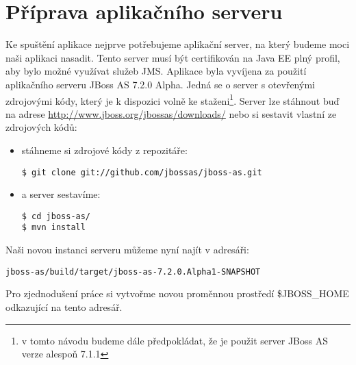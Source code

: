 \documentclass[122pt,oneside]{fithesis}
\begin{document}
\section{Příprava aplikačního serveru}
Ke spuštění aplikace nejprve potřebujeme aplikační server, na který budeme moci naši aplikaci nasadit. Tento server musí být certifikován na Java EE plný profil, aby bylo možné využívat služeb JMS. Aplikace byla vyvíjena za použití aplikačního serveru JBoss AS 7.2.0 Alpha. Jedná se o server s otevřenými zdrojovými kódy, který je k dispozici volně ke staženi\footnote{v tomto návodu budeme dále předpokládat, že je použit server JBoss AS verze alespoň 7.1.1}. Server lze stáhnout buď na adrese \href{http://www.jboss.org/jbossas/downloads/}{http://www.jboss.org/jbossas/downloads/} nebo si sestavit vlastní ze zdrojových kódů:
\begin{itemize}
  \item stáhneme si zdrojové kódy z repozitáře:
\begin{lstlisting}
$ git clone git://github.com/jbossas/jboss-as.git
\end{lstlisting}
  \item a server sestavíme:
\begin{lstlisting}
$ cd jboss-as/
$ mvn install
\end{lstlisting}
\end{itemize}
Naši novou instanci serveru můžeme nyní najít v adresáři: 
\begin{lstlisting}
jboss-as/build/target/jboss-as-7.2.0.Alpha1-SNAPSHOT
\end{lstlisting}
Pro zjednodušení práce si vytvořme novou proměnnou prostředí \$JBOSS\_HOME odkazující na tento adresář.
\end{document}
